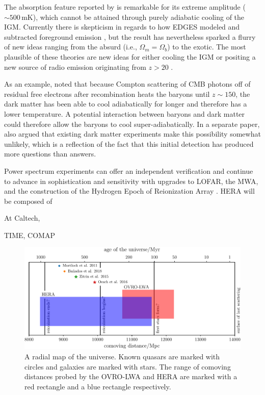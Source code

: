 \begin{bibunit}
The absorption feature reported by \citet{2018Natur.555...67B} is remarkable for its extreme
amplitude ($\sim 500\,\text{mK}$), which cannot be attained through purely adiabatic cooling of the
IGM.  Currently there is skepticism in regards to how EDGES modeled and subtracted foreground
emission \citep{2018arXiv180501421H}, but the result has nevertheless sparked a flurry of new ideas
ranging from the absurd (i.e., $\Omega_m = \Omega_b$) to the exotic.  The most plausible of these
theories are new ideas for either cooling the IGM \citep[e.g.,][]{2018Natur.555...71B} or positing a
new source of radio emission originating from $z > 20$ \citep[e.g.,][]{2018arXiv180301815E}.

As an example, \citet{2018Natur.555...71B} noted that because Compton scattering of CMB photons off
of residual free electrons after recombination heats the baryons until $z\sim 150$, the dark matter
has been able to cool adiabatically for longer and therefore has a lower temperature. A potential
interaction between baryons and dark matter could therefore allow the baryons to cool
super-adiabatically. In a separate paper, \citet{2018arXiv180303091B} also argued that existing dark
matter experiments make this possibility somewhat unlikely, which is a reflection of the fact that
this initial detection has produced more questions than answers.

Power spectrum experiments can offer an independent verification and continue to advance in
sophistication and sensitivity with upgrades to LOFAR, the MWA, and the construction of the Hydrogen
Epoch of Reionization Array \citep[HERA;][]{2017PASP..129d5001D}. HERA will be composed of



\citep{2013ExA....36..235M}

At Caltech,

TIME, COMAP


\begin{figure}[t]
    \centering
    \includegraphics[width=\textwidth]{figures/chapter1/history-of-the-universe/history-of-the-universe}
    \caption{
        A radial map of the universe. Known quasars are marked with circles and galaxies are marked
        with stars. The range of comoving distances probed by the OVRO-LWA and HERA are marked with
        a red rectangle and a blue rectangle respectively.
    }
    \label{fig:history-of-the-universe}
\end{figure}









\end{bibunit}


